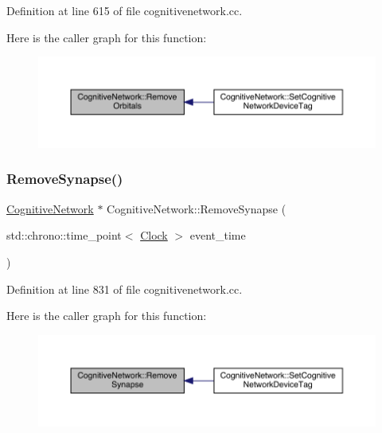 Definition at line 615 of file cognitivenetwork.\+cc.

Here is the caller graph for this function\+:
\nopagebreak
\begin{figure}[H]
\begin{center}
\leavevmode
\includegraphics[width=350pt]{class_cognitive_network_af7834d400995607c2a5a5eac7b5e006d_icgraph}
\end{center}
\end{figure}
\mbox{\label{class_cognitive_network_a0764ede1c23caa7022a01657a0e3726b}} 
\subsubsection{\texorpdfstring{Remove\+Synapse()}{RemoveSynapse()}}
{\footnotesize\ttfamily \hyperlink{class_cognitive_network}{Cognitive\+Network} $\ast$ Cognitive\+Network\+::\+Remove\+Synapse (\begin{DoxyParamCaption}\item[{std\+::chrono\+::time\+\_\+point$<$ \hyperlink{universe_8h_a0ef8d951d1ca5ab3cfaf7ab4c7a6fd80}{Clock} $>$}]{event\+\_\+time }\end{DoxyParamCaption})}



Definition at line 831 of file cognitivenetwork.\+cc.

Here is the caller graph for this function\+:
\nopagebreak
\begin{figure}[H]
\begin{center}
\leavevmode
\includegraphics[width=350pt]{class_cognitive_network_a0764ede1c23caa7022a01657a0e3726b_icgraph}
\end{center}
\end{figure}
\mbox{\label{class_cognitive_network_a87d6628f388baed1edb8efda9062c443}} 
